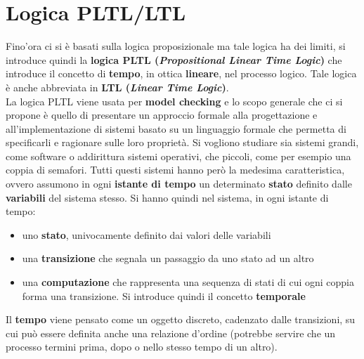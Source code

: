 \documentclass[a4paper,12pt, oneside]{book}
\begin{document}
\section{Logica PLTL/LTL}
Fino'ora ci si è basati sulla logica proposizionale ma tale logica ha dei
limiti, si introduce quindi la 
\textbf{logica PLTL (\textit{Propositional Linear Time Logic})} che introduce il
concetto di \textbf{tempo}, in ottica \textbf{lineare}, nel processo
logico. Tale logica è anche abbreviata in \textbf{LTL (\textit{Linear Time
    Logic})}.\\  
La logica PLTL viene usata per \textbf{model checking} e lo scopo generale che
ci si propone è quello di presentare un approccio formale alla progettazione e
all'implementazione di sistemi basato su un linguaggio formale che permetta di
specificarli e ragionare sulle loro proprietà. Si vogliono studiare sia sistemi
grandi, come software o addirittura sistemi operativi, che piccoli, come per
esempio una coppia di semafori. Tutti questi sistemi hanno però la medesima
caratteristica, ovvero assumono in ogni \textbf{istante di tempo} un determinato
\textbf{stato} definito dalle \textbf{variabili} del sistema stesso. Si hanno
quindi nel sistema, in ogni istante di tempo:
\begin{itemize}
  \item uno \textbf{stato}, univocamente definito dai valori delle variabili
  \item una \textbf{transizione} che segnala un passaggio da uno stato ad un
  altro
  \item una \textbf{computazione} che rappresenta una sequenza di stati di cui
  ogni coppia forma una transizione. Si introduce quindi il concetto
  \textbf{temporale} 
\end{itemize}
Il \textbf{tempo} viene pensato come un oggetto discreto, cadenzato dalle
transizioni, su cui può essere definita anche una relazione d'ordine (potrebbe
servire che un processo termini prima, dopo o nello stesso tempo di un altro).
\end{document}
